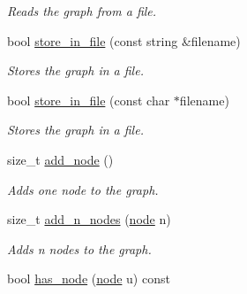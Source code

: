 \begin{DoxyCompactItemize}
\begin{DoxyCompactList}\small\item\em Reads the graph from a file. \end{DoxyCompactList}\item 
bool \hyperlink{classlgraph_1_1utils_1_1wxgraph_aff18a1cb62b8580956e8ddbb042e65e9}{store\+\_\+in\+\_\+file} (const string \&filename)\hypertarget{classlgraph_1_1utils_1_1wxgraph_aff18a1cb62b8580956e8ddbb042e65e9}{}\label{classlgraph_1_1utils_1_1wxgraph_aff18a1cb62b8580956e8ddbb042e65e9}

\begin{DoxyCompactList}\small\item\em Stores the graph in a file. \end{DoxyCompactList}\item 
bool \hyperlink{classlgraph_1_1utils_1_1wxgraph_aaa403d0b1dbca1e8e6d9cb30260e26df}{store\+\_\+in\+\_\+file} (const char $\ast$filename)\hypertarget{classlgraph_1_1utils_1_1wxgraph_aaa403d0b1dbca1e8e6d9cb30260e26df}{}\label{classlgraph_1_1utils_1_1wxgraph_aaa403d0b1dbca1e8e6d9cb30260e26df}

\begin{DoxyCompactList}\small\item\em Stores the graph in a file. \end{DoxyCompactList}\item 
size\+\_\+t \hyperlink{classlgraph_1_1utils_1_1xxgraph_af41baf2c098e872731ad646aeec1b382}{add\+\_\+node} ()
\begin{DoxyCompactList}\small\item\em Adds one node to the graph. \end{DoxyCompactList}\item 
size\+\_\+t \hyperlink{classlgraph_1_1utils_1_1xxgraph_af4f3782c1a55f73c6f34f2f2c26fb404}{add\+\_\+n\+\_\+nodes} (\hyperlink{namespacelgraph_1_1utils_a7bd66ede3805ef121bc2835bd48de0cf}{node} n)
\begin{DoxyCompactList}\small\item\em Adds {\itshape n} nodes to the graph. \end{DoxyCompactList}\item 
bool \hyperlink{classlgraph_1_1utils_1_1xxgraph_a026ab064c2be26790cc1f547be2157c9}{has\+\_\+node} (\hyperlink{namespacelgraph_1_1utils_a7bd66ede3805ef121bc2835bd48de0cf}{node} u) const \hypertarget{classlgraph_1_1utils_1_1xxgraph_a026ab064c2be26790cc1f547be2157c9}{}\label{classlgraph_1_1utils_1_1xxgraph_a026ab064c2be26790cc1f547be2157c9}


\end{DoxyCompactItemize}
